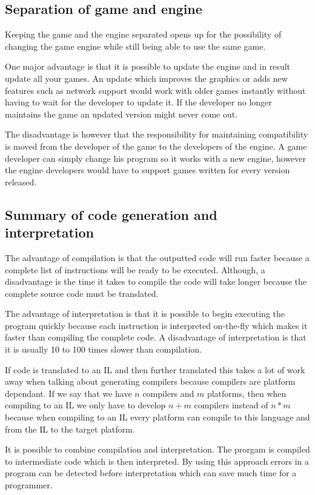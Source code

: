 

\subsection{Separation of game and engine}
\label{subsec:engineseperation}
Keeping the game and the engine separated opens up for the possibility of
changing the game engine while still being able to use the same game. 

One major advantage is that it is possible to update the engine and in result
update all your games. An update which improves the graphics or adds new
features such as network support would work with older games instantly without
having to wait for the developer to update it. If the developer no longer
maintains the game an updated version might never come out.

The disadvantage is however that the responsibility for maintaining
compatibility is moved from the developer of the game to the developers of the
engine. A game developer can simply change his program so it works with a new
engine, however the engine developers would have to support games written for
every version released.

\subsection{Summary of code generation and interpretation}
The advantage of compilation is that the outputted code will run faster because 
a complete list of instructions will be ready to be executed. Although,
a disadvantage is the time it takes to compile the code will take longer because
the complete source code must be translated.

The advantage of interpretation is that it is possible to begin executing the
program quickly because each instruction is interpreted on-the-fly which makes
it faster than compiling the complete code. A disadvantage of interpretation is
that it is usually 10 to 100 times slower than compilation.

If code is translated to an IL and then further translated this takes a lot of
work away when talking about generating compilers because compilers are platform
dependant. If we say that we have $n$ compilers and $m$ platforms, then when
compiling to an IL we only have to develop $n+m$ compilers instead of $n*m$
because when compiling to an IL every platform can compile to this language and
from the IL to the target platform.

It is possible to combine compilation and interpretation. The prorgam is
compiled to intermediate code which is then interpreted. By using this approach
errors in a program can be detected before interpretation which can save much
time for a programmer.

